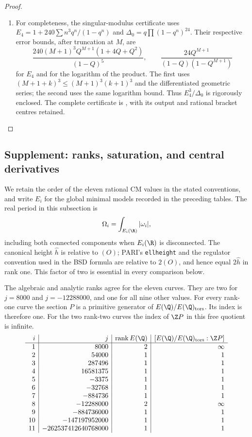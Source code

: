 \begin{proof}
\begin{enumerate}[label=\arabic*.,leftmargin=*]
\item For completeness, the singular-modulus certificate uses
$E_4=1+240\sum n^3q^n/(1-q^n)$ and
$\Delta_0=q\prod(1-q^n)^{24}$. Their respective error
bounds, after truncation at $M$, are
\[
 \frac{240(M+1)^3Q^{M+1}(1+4Q+Q^2)}{(1-Q)^5},
 \qquad
 \frac{24Q^{M+1}}{(1-Q)(1-Q^{M+1})}
\]
for $E_4$ and for the logarithm of the product. The first
uses $(M+1+k)^3\le(M+1)^3(k+1)^3$ and the differentiated
geometric series; the second uses the same logarithm bound.
Thus $E_4^3/\Delta_0$ is rigorously enclosed. The complete
certificate is , with its
output and rational bracket centres retained.
\end{enumerate}
\end{proof}


\subsection{Supplement: ranks, saturation, and central derivatives}

We retain the order of the eleven rational CM values in the stated conventions, and
write $E_i$ for the global minimal models recorded in the preceding
tables. The real period in this subsection is
\[
 \Omega_i=\int_{E_i(\R)}|\omega_i|,
\]
including both connected components when $E_i(\R)$ is disconnected.
The canonical height $\widehat h$ is relative to $(O)$; PARI's
\texttt{ellheight} and the regulator convention used in the BSD formula
are relative to $2(O)$, and hence equal $2\widehat h$ in rank one.
This factor of two is essential in every comparison below.

\begin{proposition}\hypertarget{tag-0010}{}\label{ari:C.6.R1}

The algebraic and analytic ranks agree for the eleven curves. They are
two for $j=8000$ and $j=-12288000$, and one for all nine other values.
For every rank-one curve the section $P$ is a primitive generator of
$E(\Q)/E(\Q)_{\rm tors}$. Its index is therefore one. For the two
rank-two curves the index of $\Z P$ in this free quotient is infinite.
\[
\begin{array}{r|r|r|r}
i&j&\operatorname{rank}E(\Q)&[E(\Q)/E(\Q)_{\rm tors}:\Z P]\\\hline
1&8000&2&\infty\\
2&54000&1&1\\
3&287496&1&1\\
4&16581375&1&1\\
5&-3375&1&1\\
6&-32768&1&1\\
7&-884736&1&1\\
8&-12288000&2&\infty\\
9&-884736000&1&1\\
10&-147197952000&1&1\\
11&-262537412640768000&1&1
\end{array}
\]
\end{proposition}


